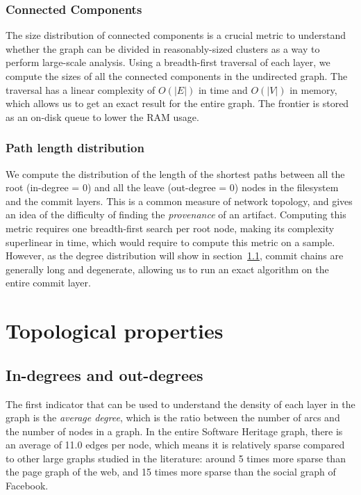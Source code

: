 \subsubsection{Connected Components}
The size distribution of connected components is a crucial metric to understand
whether the graph can be divided in reasonably-sized clusters as a way to
perform large-scale analysis.
Using a breadth-first traversal of each layer, we compute the sizes of all the
connected components in the undirected graph. The traversal has a linear
complexity of $O(|E|)$ in time and $O(|V|)$ in memory, which
allows us to get an exact result for the entire graph. The frontier is stored
as an on-disk queue to lower the RAM usage.

\subsubsection{Path length distribution}%
\label{sec:metho:avgpath}

We compute the distribution of the length of the shortest paths between all the
root (in-degree = 0) and all the leave (out-degree = 0) nodes in the filesystem
and the commit layers. This is a common measure of network topology, and gives
an idea of the difficulty of finding the \emph{provenance} of an artifact.
Computing this metric requires one breadth-first search per root node, making
its complexity superlinear in time, which would require to compute this metric
on a sample. However, as the degree distribution will show in
section~\cref{sec:topo:degrees},
commit chains are generally long and degenerate, allowing us to run an exact
algorithm on the entire commit layer.


\section{Topological properties}
\label{sec:topology-results}

\subsection{In-degrees and out-degrees}
\label{sec:topo:degrees}

The first indicator that can be used to understand the density of each layer in
the graph is the \emph{average degree}, which is the ratio between the number
of arcs and the number of nodes in a graph.
In the entire Software Heritage graph, there is an average of 11.0 edges per
node, which means it is relatively sparse compared to other large graphs
studied in the literature: around 5 times more sparse than the page graph of the
web, and 15 times more sparse than the social graph of Facebook.

